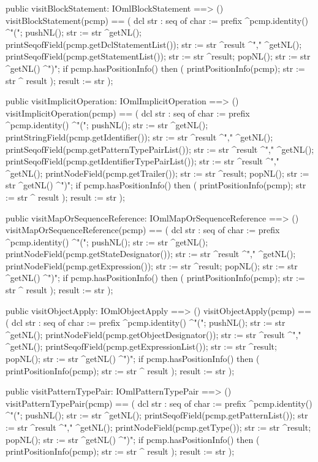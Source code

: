 \begin{vdm_al}
  public visitBlockStatement: IOmlBlockStatement ==> ()
  visitBlockStatement(pcmp) ==
    ( dcl str : seq of char := prefix ^pcmp.identity() ^"(";
      pushNL();
      str := str ^getNL();
      printSeqofField(pcmp.getDclStatementList());
      str := str ^result ^"," ^getNL();
      printSeqofField(pcmp.getStatementList());
      str := str ^result;
      popNL();
      str := str ^getNL() ^")";
      if pcmp.hasPositionInfo()
      then ( printPositionInfo(pcmp);
             str := str ^ result );
      result := str );

  public visitImplicitOperation: IOmlImplicitOperation ==> ()
  visitImplicitOperation(pcmp) ==
    ( dcl str : seq of char := prefix ^pcmp.identity() ^"(";
      pushNL();
      str := str ^getNL();
      printStringField(pcmp.getIdentifier());
      str := str ^result ^"," ^getNL();
      printSeqofField(pcmp.getPatternTypePairList());
      str := str ^result ^"," ^getNL();
      printSeqofField(pcmp.getIdentifierTypePairList());
      str := str ^result ^"," ^getNL();
      printNodeField(pcmp.getTrailer());
      str := str ^result;
      popNL();
      str := str ^getNL() ^")";
      if pcmp.hasPositionInfo()
      then ( printPositionInfo(pcmp);
             str := str ^ result );
      result := str );

  public visitMapOrSequenceReference: IOmlMapOrSequenceReference ==> ()
  visitMapOrSequenceReference(pcmp) ==
    ( dcl str : seq of char := prefix ^pcmp.identity() ^"(";
      pushNL();
      str := str ^getNL();
      printNodeField(pcmp.getStateDesignator());
      str := str ^result ^"," ^getNL();
      printNodeField(pcmp.getExpression());
      str := str ^result;
      popNL();
      str := str ^getNL() ^")";
      if pcmp.hasPositionInfo()
      then ( printPositionInfo(pcmp);
             str := str ^ result );
      result := str );

  public visitObjectApply: IOmlObjectApply ==> ()
  visitObjectApply(pcmp) ==
    ( dcl str : seq of char := prefix ^pcmp.identity() ^"(";
      pushNL();
      str := str ^getNL();
      printNodeField(pcmp.getObjectDesignator());
      str := str ^result ^"," ^getNL();
      printSeqofField(pcmp.getExpressionList());
      str := str ^result;
      popNL();
      str := str ^getNL() ^")";
      if pcmp.hasPositionInfo()
      then ( printPositionInfo(pcmp);
             str := str ^ result );
      result := str );

  public visitPatternTypePair: IOmlPatternTypePair ==> ()
  visitPatternTypePair(pcmp) ==
    ( dcl str : seq of char := prefix ^pcmp.identity() ^"(";
      pushNL();
      str := str ^getNL();
      printSeqofField(pcmp.getPatternList());
      str := str ^result ^"," ^getNL();
      printNodeField(pcmp.getType());
      str := str ^result;
      popNL();
      str := str ^getNL() ^")";
      if pcmp.hasPositionInfo()
      then ( printPositionInfo(pcmp);
             str := str ^ result );
      result := str );


\end{vdm_al}
